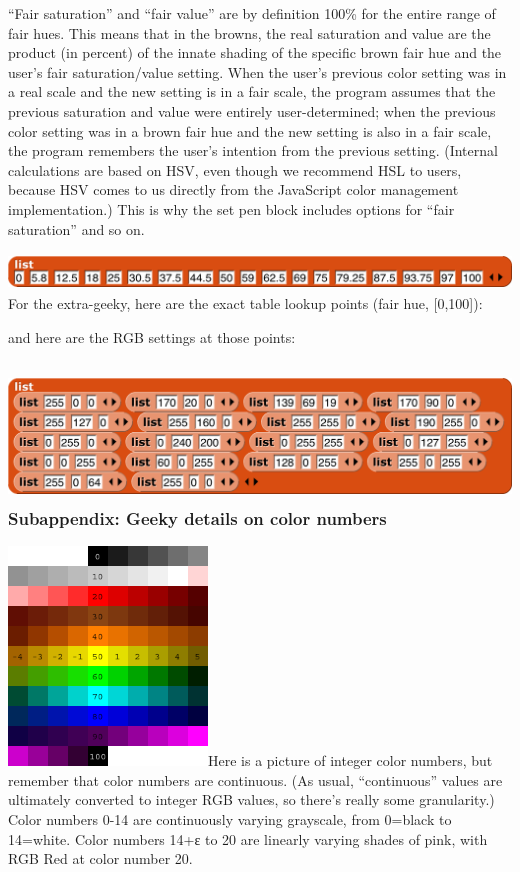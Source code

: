 ``Fair saturation'' and ``fair value'' are by definition 100\% for the
entire range of fair hues. This means that in the browns, the real
saturation and value are the product (in percent) of the innate shading
of the specific brown fair hue and the user's fair saturation/value
setting. When the user's previous color setting was in a real scale and
the new setting is in a fair scale, the program assumes that the
previous saturation and value were entirely user-determined; when the
previous color setting was in a brown fair hue and the new setting is
also in a fair scale, the program remembers the user's intention from
the previous setting. (Internal calculations are based on HSV, even
though we recommend HSL to users, because HSV comes to us directly from
the JavaScript color management implementation.) This is why the set pen
block includes options for ``fair saturation'' and so on.

\includegraphics[width=5.9875in,height=0.37847in]{media/image1258.png}For
the extra-geeky, here are the exact table lookup points (fair hue,
{[}0,100{]}):

and here are the RGB settings at those points:

\subsubsection[\hfill\break
Subappendix: Geeky details on color
numbers]{\texorpdfstring{\protect\includegraphics[width=5.98403in,height=1.37361in]{media/image1259.png}\\
Subappendix: Geeky details on color
numbers}{ Subappendix: Geeky details on color numbers}}\label{subappendix-geeky-details-on-color-numbers}

\includegraphics[width=2.08333in,height=2.29167in]{media/image1260.png}Here
is a picture of integer color numbers, but remember that color numbers
are continuous. (As usual, ``continuous'' values are ultimately
converted to integer RGB values, so there's really some granularity.)
Color numbers 0-14 are continuously varying grayscale, from 0=black to
14=white. Color numbers 14+ε to 20 are linearly varying shades of pink,
with RGB Red at color number 20.

